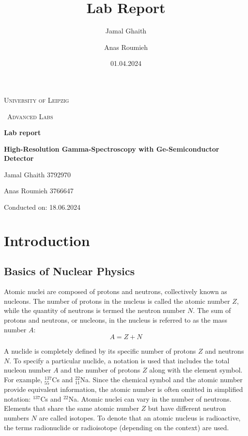 \documentclass{article}
\title{Lab Report}
\author{Jamal Ghaith}
\author{Anas Roumieh}
\date{01.04.2024}
\begin{document}
\begin{titlepage}
	\centering
	{\scshape\LARGE University of Leipzig \par}
	\vspace{1cm}
	{\scshape\ Advanced Labs\par}
	\vspace{1.5cm}
	{\huge\bfseries Lab report\par}
	\vspace{2cm}
	{\huge\bfseries High-Resolution Gamma-Spectroscopy with Ge-Semiconductor Detector\par}
	\vspace{2cm}
	{\Large Jamal Ghaith 3792970\par}
    {\Large Anas Roumieh 3766647\par}
	\vfill

    {\Large Conducted on: 18.06.2024 \par}
	\vfill
\end{titlepage}


\tableofcontents
{}
\pagebreak{}

\section{Introduction}

\subsection{Basics of Nuclear Physics}
Atomic nuclei are composed of protons and neutrons, collectively known as nucleons. The number of protons in the nucleus is called the atomic number $Z$, while the quantity of neutrons is termed the neutron number $N$. The sum of protons and neutrons, or nucleons, in the nucleus is referred to as the mass number $A$: 
\begin{equation}
    A = Z + N
\end{equation}

A nuclide is completely defined by its specific number of protons $Z$ and neutrons $N$. To specify a particular nuclide, a notation is used that includes the total nucleon number $A$ and the number of protons $Z$ along with the element symbol. For example, $^{137} _{55}$Cs and $^{22}_{11}$Na. Since the chemical symbol and the atomic number provide equivalent information, the atomic number is often omitted in simplified notation: $^{137}$Cs and $^{22}$Na. Atomic nuclei can vary in the number of neutrons. Elements that share the same atomic number $Z$ but have different neutron numbers $N$ are called isotopes. To denote that an atomic nucleus is radioactive, the terms radionuclide or radioisotope (depending on the context) are used.
\end{document}
